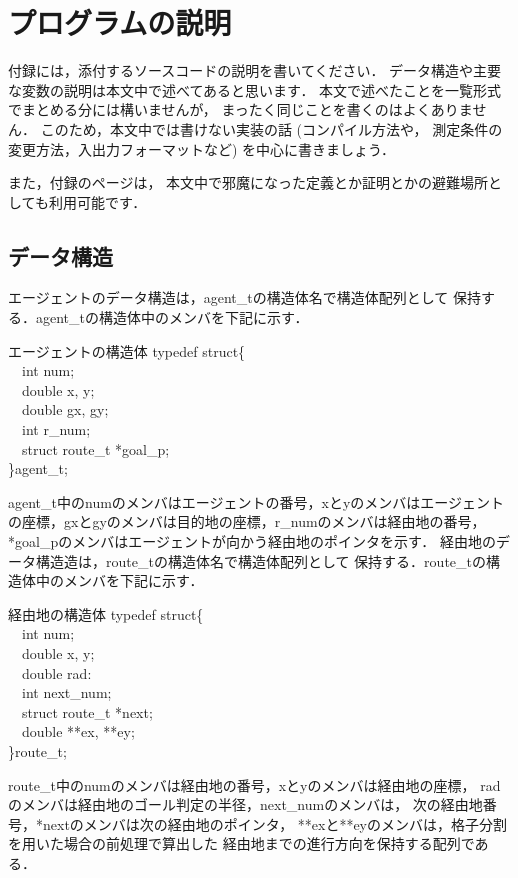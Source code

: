 \chapter{プログラムの説明}
\label{sec:appendix}
付録には，添付するソースコードの説明を書いてください．
データ構造や主要な変数の説明は本文中で述べてあると思います．
本文で述べたことを一覧形式でまとめる分には構いませんが，
まったく同じことを書くのはよくありません．
このため，本文中では書けない実装の話
(コンパイル方法や， 測定条件の変更方法，入出力フォーマットなど)
を中心に書きましょう．

また，付録のページは，
本文中で邪魔になった定義とか証明とかの避難場所としても利用可能です．

\section{データ構造}
エージェントのデータ構造は，agent\_tの構造体名で構造体配列として
保持する．agent\_tの構造体中のメンバを下記に示す．
%
\begin{itembox}[l]{エージェントの構造体}
typedef struct\{\\
　int num;\\
　double x, y;\\
　double gx, gy;\\
　int r\_num;\\
　struct route\_t *goal\_p;\\
\}agent\_t;
\end{itembox}
%
agent\_t中のnumのメンバはエージェントの番号，xとyのメンバはエージェント
の座標，gxとgyのメンバは目的地の座標，r\_numのメンバは経由地の番号，
*goal\_pのメンバはエージェントが向かう経由地のポインタを示す．
経由地のデータ構造造は，route\_tの構造体名で構造体配列として
保持する．route\_tの構造体中のメンバを下記に示す．
%
\begin{itembox}[l]{経由地の構造体}
typedef struct\{\\
　int num;\\
　double x, y;\\
　double rad:\\
　int next\_num;\\
　struct route\_t *next;\\
　double **ex, **ey;\\
\}route\_t;
\end{itembox}
%
route\_t中のnumのメンバは経由地の番号，xとyのメンバは経由地の座標，
radのメンバは経由地のゴール判定の半径，next\_numのメンバは，
次の経由地番号，*nextのメンバは次の経由地のポインタ，
**exと**eyのメンバは，格子分割を用いた場合の前処理で算出した
経由地までの進行方向を保持する配列である．


